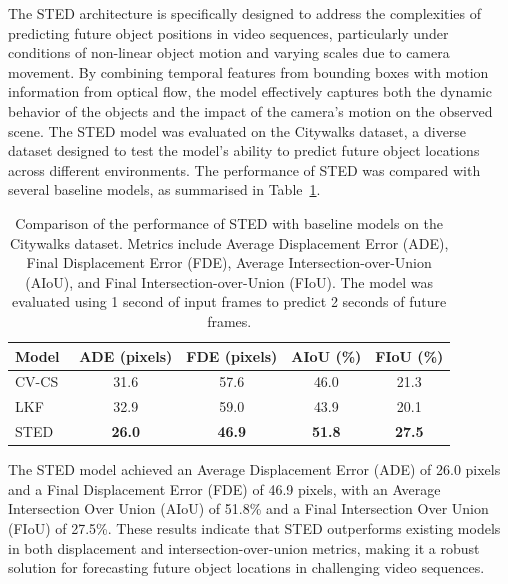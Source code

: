 \documentclass[12pt,oneside]{book} %
\begin{document}
The STED architecture is specifically designed to address the complexities of
predicting future object positions in video sequences, particularly under
conditions of non-linear object motion and varying scales due to camera
movement. By combining temporal features from bounding boxes with motion
information from optical flow, the model effectively captures both the dynamic
behavior of the objects and the impact of the camera's motion on the observed
scene. The STED model was evaluated on the Citywalks dataset, a diverse dataset
designed to test the model's ability to predict future object locations across
different environments. The performance of STED was compared with several
baseline models, as summarised in Table~\ref{tab:sted-results}.

\begin{table}[H]
    \centering
    \caption{Comparison of the performance of STED with baseline models on the Citywalks dataset. Metrics include Average Displacement Error (ADE), Final Displacement Error (FDE), Average Intersection-over-Union (AIoU), and Final Intersection-over-Union (FIoU). The model was evaluated using 1 second of input frames to predict 2 seconds of future frames.}
    \begin{adjustbox}{max width=\textwidth}
        \begin{tabular}{lcccc}
            \toprule
            \textbf{Model}                         & \textbf{ADE (pixels)} & \textbf{FDE (pixels)} & \textbf{AIoU (\%)} & \textbf{FIoU (\%)} \\ 
            \midrule
            CV-CS~\cite{MultipleObjectForecasting} & 31.6                  & 57.6                  & 46.0               & 21.3               \\
            LKF~\cite{MultipleObjectForecasting}   & 32.9                  & 59.0                  & 43.9               & 20.1               \\
            STED~\cite{MultipleObjectForecasting}  & \textbf{26.0}         & \textbf{46.9}         & \textbf{51.8}      & \textbf{27.5}      \\
            \bottomrule
        \end{tabular}
    \end{adjustbox}
    \label{tab:sted-results}
\end{table}

The STED model achieved an Average Displacement Error (ADE) of 26.0 pixels and
a Final Displacement Error (FDE) of 46.9 pixels, with an Average Intersection
Over Union (AIoU) of 51.8\% and a Final Intersection Over Union (FIoU) of
27.5\%. These results indicate that STED outperforms existing models in both
displacement and intersection-over-union metrics, making it a robust solution
for forecasting future object locations in challenging video sequences.
\end{document}
